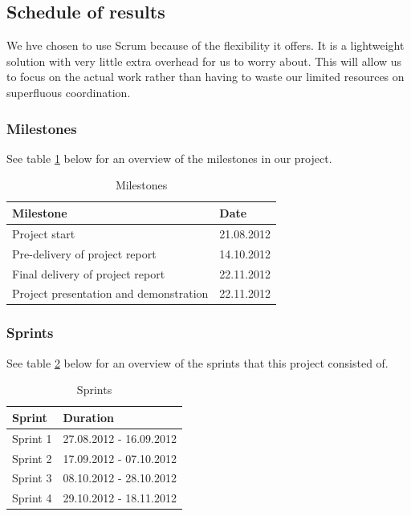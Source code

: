 \subsection{Schedule of results}
We hve chosen to use Scrum because of the flexibility it offers. It is a lightweight solution with very little extra overhead for us to worry about. This will allow us to focus on the actual work rather than having to waste our limited resources on superfluous coordination.

\subsubsection*{Milestones}
See table \ref{tab:milestones} below for an overview of the milestones in our project.
\begin{table}[h!]
\begin{center}
\begin{tabular}{l|l} \hline
\textbf{Milestone} & \textbf{Date} \\ \hline \hline
Project start &  21.08.2012\\ 
Pre-delivery of project report & 14.10.2012\\ 
Final delivery of project report & 22.11.2012\\
Project presentation and demonstration & 22.11.2012\\ \hline
\end{tabular}
\end{center}
\caption{Milestones} \label{tab:milestones}
\end{table}

\newpage

\subsubsection*{Sprints}
See table \ref{tab:sprints} below for an overview of the sprints that this project consisted of.
\begin{table}[h!]
\begin{center}
\begin{tabular}{l|l} \hline
\textbf{Sprint} & \textbf{Duration} \\ \hline \hline
Sprint 1 &  27.08.2012 - 16.09.2012\\
Sprint 2 & 17.09.2012 - 07.10.2012\\
Sprint 3 & 08.10.2012 - 28.10.2012\\
Sprint 4 & 29.10.2012 - 18.11.2012\\ \hline
\end{tabular}
\end{center}
\caption{Sprints} \label{tab:sprints}
\end{table}


